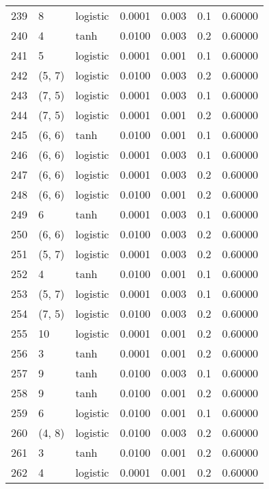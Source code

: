 \begin{tabular}{lllrrrr}
239 &           8 &  logistic &  0.0001 &  0.003 &  0.1 &   0.60000 \\
240 &           4 &      tanh &  0.0100 &  0.003 &  0.2 &   0.60000 \\
241 &           5 &  logistic &  0.0001 &  0.001 &  0.1 &   0.60000 \\
242 &      (5, 7) &  logistic &  0.0100 &  0.003 &  0.2 &   0.60000 \\
243 &      (7, 5) &  logistic &  0.0001 &  0.003 &  0.1 &   0.60000 \\
244 &      (7, 5) &  logistic &  0.0001 &  0.001 &  0.2 &   0.60000 \\
245 &      (6, 6) &      tanh &  0.0100 &  0.001 &  0.1 &   0.60000 \\
246 &      (6, 6) &  logistic &  0.0001 &  0.003 &  0.1 &   0.60000 \\
247 &      (6, 6) &  logistic &  0.0001 &  0.003 &  0.2 &   0.60000 \\
248 &      (6, 6) &  logistic &  0.0100 &  0.001 &  0.2 &   0.60000 \\
249 &           6 &      tanh &  0.0001 &  0.003 &  0.1 &   0.60000 \\
250 &      (6, 6) &  logistic &  0.0100 &  0.003 &  0.2 &   0.60000 \\
251 &      (5, 7) &  logistic &  0.0001 &  0.003 &  0.2 &   0.60000 \\
252 &           4 &      tanh &  0.0100 &  0.001 &  0.1 &   0.60000 \\
253 &      (5, 7) &  logistic &  0.0001 &  0.003 &  0.1 &   0.60000 \\
254 &      (7, 5) &  logistic &  0.0100 &  0.003 &  0.2 &   0.60000 \\
255 &          10 &  logistic &  0.0001 &  0.001 &  0.2 &   0.60000 \\
256 &           3 &      tanh &  0.0001 &  0.001 &  0.2 &   0.60000 \\
257 &           9 &      tanh &  0.0100 &  0.003 &  0.1 &   0.60000 \\
258 &           9 &      tanh &  0.0100 &  0.001 &  0.2 &   0.60000 \\
259 &           6 &  logistic &  0.0100 &  0.001 &  0.1 &   0.60000 \\
260 &      (4, 8) &  logistic &  0.0100 &  0.003 &  0.2 &   0.60000 \\
261 &           3 &      tanh &  0.0100 &  0.001 &  0.2 &   0.60000 \\
262 &           4 &  logistic &  0.0001 &  0.001 &  0.2 &   0.60000 \\

\end{tabular}
